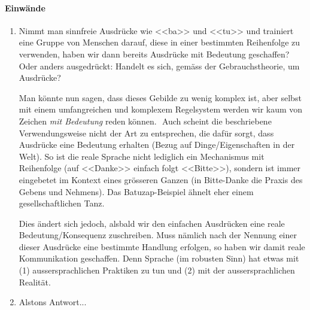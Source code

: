 \documentclass[../main.tex]{subfiles}
\begin{document}
\paragraph{Einwände}
\begin{enumerate}[listparindent=0.7cm]
	\item 
		Nimmt man sinnfreie Ausdrücke wie <<ba>> und <<tu>> und trainiert eine Gruppe von Menschen darauf, diese in einer bestimmten Reihenfolge zu verwenden, haben wir dann bereits Ausdrücke mit Bedeutung geschaffen? Oder anders ausgedrückt: Handelt es sich, gemäss der Gebrauchstheorie, um Ausdrücke?
		
		Man könnte nun sagen, dass dieses Gebilde zu wenig komplex ist, aber selbst mit einem umfangreichen und komplexem Regelsystem werden wir kaum von Zeichen \textit{mit Bedeutung} reden können.  Auch scheint die beschriebene Verwendungsweise nicht der Art zu entsprechen, die dafür sorgt, dass Ausdrücke eine Bedeutung erhalten (Bezug auf Dinge/Eigenschaften in der Welt). So ist die reale Sprache nicht lediglich ein Mechanismus mit Reihenfolge (auf <<Danke>> einfach folgt <<Bitte>>), sondern ist immer eingebetet im Kontext eines grösseren Ganzen (in Bitte-Danke die Praxis des Gebens und Nehmens). Das Batuzap-Beispiel ähnelt eher einem gesellschaftlichen Tanz.

		Dies ändert sich jedoch, alsbald wir den einfachen Ausdrücken eine reale Bedeutung/Konsequenz zuschreiben. Muss nämlich nach der Nennung einer dieser Ausdrücke eine bestimmte Handlung erfolgen, so haben wir damit reale Kommunikation geschaffen. Denn Sprache (im robusten Sinn) hat etwas mit (1) aussersprachlichen Praktiken zu tun und (2) mit der aussersprachlichen Realität.
	\item 
		Alstons Antwort... %
\end{enumerate}
\end{document}

